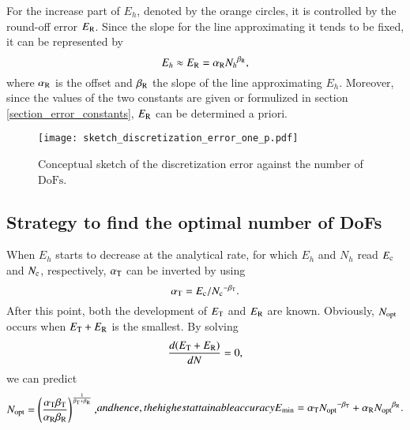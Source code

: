 \documentclass[review,3p]{elsarticle}
\begin{document}
For the increase part of $E_h$, denoted by the orange circles, it is controlled by the round-off error $E_{\rm R}$. Since the slope for the line approximating it tends to be fixed\cite{Babuska2018Roundoff,WalterFrei}, it can be represented by 
\begin{equation}
 E_{h} \approx E_{\rm R} = \alpha_{\rm R}{N_{h}}^{\beta_{\rm R}},		\label{formula_round-off_error}
\end{equation}
where $\alpha_{\rm R}$ is the offset and $\beta_{\rm R}$ the slope of the line approximating $E_h$. Moreover, since the values of the two constants are given or formulized in section \ref{section_error_constants}, $E_{\rm R}$ can be determined a priori.

 \begin{figure}[!ht]
 \centering
     \texttt{[image: sketch\_discretization\_error\_one\_p.pdf]}
     \caption{Conceptual sketch of the discretization error against the number of $\text{DoFs}$.}
     \label{sketch_discretization_error_one_p}
 \end{figure}

\subsection{Strategy to find the optimal number of DoFs}           \label{section_strategy}

When $E_h$ starts to decrease at the analytical rate, for which $E_h$ and $N_h$ read ${E_{\rm c}}$ and ${N_{\rm c}}$, respectively, $\alpha_{\rm T}$ can be inverted by using
\begin{equation}
 \alpha_{\rm T} = {E_{\rm c}}/{N_{\rm c}}^{- \beta_{\rm T}}.		\label{formula_offset_truncation_error}
\end{equation}
After this point, both the development of $E_{\rm T}$ and $E_{\rm R}$ are known. Obviously, $N_{\rm opt}$ occurs when $E_{\rm T}+E_{\rm R}$ is the smallest. By solving
\begin{equation}
    \frac{d(E_{\rm T}+E_{\rm R})}{dN}=0,    \label{derivative_condition_N_opt}
\end{equation}
we can predict
\begin{subequations}
\begin{align}
 N_{\rm opt} = \left( \frac{\alpha_{\rm T} \beta_{\rm T}}{\alpha _{\rm R} \beta_{\rm R}} \right)^{\frac{1}{\beta_{\rm T} + \beta_{\rm R}}},
\end{align}
and hence, the highest attainable accuracy
\begin{align}
 E_{\rm min} = \alpha_{\rm T} {N_{\rm opt}}^{- {\beta _{\rm T}}}+\alpha_{\rm R} {N_{\rm opt}}^{{\beta _{\rm R}}}.
\end{align}
\end{subequations}
\end{document}
